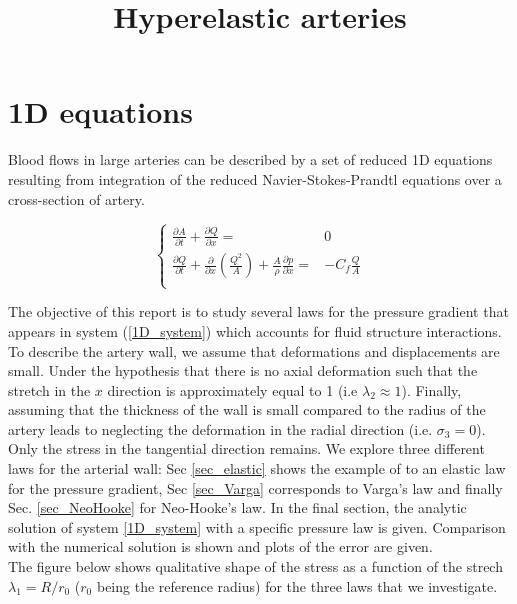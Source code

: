 \documentclass{config}
\title{Hyperelastic arteries}
\begin{document}
\maketitle
\section{1D equations}
  
Blood flows  in large arteries can be described by a set of reduced 1D equations resulting from integration of the reduced Navier-Stokes-Prandtl equations over a cross-section of artery. 

\begin{equation}\label{1D_system}
\left\{\begin{array}{rl}
\displaystyle \frac{\partial A}{ \partial t } + \frac{\partial Q}{\partial x} = & 0 \\ 
\displaystyle \frac{\partial Q}{\partial t} + \frac{\partial }{\partial x} \left( \frac{Q^2}{A}\right) + \frac{A}{\rho} \frac{\partial p }{\partial x} =&  \displaystyle - C_f \frac{Q}{A} \\
\end{array} \right.
\end{equation}

The objective of this report is to study several laws for the pressure gradient that appears in system (\ref{1D_system}) which accounts for fluid structure interactions. \\

To describe the artery wall, we assume that deformations and displacements are small. Under the hypothesis that there is no axial deformation such that the stretch in the $x$ direction is approximately equal to 1 (i.e $\lambda_2 \approx 1 $). Finally, assuming that the thickness of the wall is small compared to the radius of the artery leads to neglecting the deformation in the radial direction (i.e. $\sigma_3 = 0$). Only the stress in the tangential direction remains. We explore three different laws for the arterial wall: Sec \ref{sec_elastic} shows the example of to an elastic law for the pressure gradient, Sec \ref{sec_Varga} corresponds to Varga's law and finally Sec. \ref{sec_NeoHooke} for Neo-Hooke's law. In the final section, the analytic solution of system \ref{1D_system} with a specific pressure law is given. Comparison with the numerical solution is shown and plots of the error are given. \\ 

The figure below shows qualitative shape of the stress as a function of the strech $\lambda_1 = R/r_0$ ($r_0$ being the reference radius) for the three laws that we investigate. 
\end{document}
